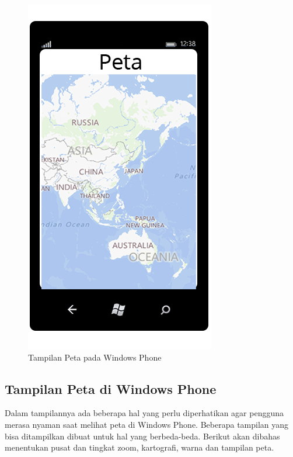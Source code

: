 \clearpage

\begin{figure}[h]
	\centering
		\includegraphics[scale=0.1]{Gambar/map}
	\caption{Tampilan Peta pada Windows Phone}
	\label{fig:peta}
\end{figure}

\subsection{Tampilan Peta di Windows Phone}
\label{subsec:Tampilan Peta di Windows Phone}
\hspace{0.5cm} Dalam tampilannya ada beberapa hal yang perlu diperhatikan agar pengguna merasa nyaman saat melihat peta di Windows Phone. Beberapa tampilan yang bisa ditampilkan dibuat untuk hal yang berbeda-beda. Berikut akan dibahas menentukan pusat dan tingkat zoom, kartografi, warna dan tampilan peta.

